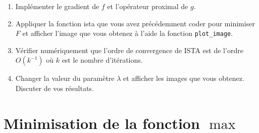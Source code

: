\documentclass[a4paper,french,12pt]{article}
\begin{document}
\begin{enumerate}
\item Implémenter le gradient de $f$ et l'opérateur proximal de $g$.
  
\item Appliquer la fonction ista que vous avez précédemment coder pour minimiser $F$ et afficher l'image que vous obtenez à l'aide la fonction \lstinline+plot_image+.
  
\item Vérifier numériquement que l'ordre de convergence de ISTA est de l'ordre $O(k^{-1})$ où $k$ est le nombre d'itérations.
  
\item Changer la valeur du paramètre $\lambda$ et afficher les images que vous obtenez. Discuter de vos résultats. 
\end{enumerate}

\section{Minimisation de la fonction $\max$}
\label{sec:minimisation-de-la}
\end{document}
